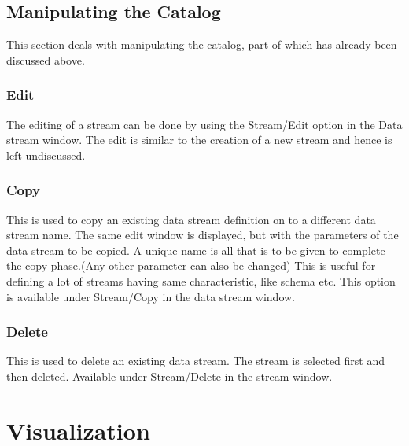 
\subsection{Manipulating the Catalog}

This section deals with manipulating the catalog, part of which has already been
discussed above.


\subsubsection{Edit}

The editing of a stream can be done by using the Stream/Edit option in the Data
stream window. The edit is similar to the creation of a new stream and hence is
left undiscussed.

\subsubsection{Copy}

This is used to copy an existing data stream definition on to a different data
stream name. The same edit window is displayed, but with the parameters of the
data stream to be copied. A unique name is all that is to be given to complete
the copy phase.(Any other parameter can also be changed) This is useful for
defining a lot of streams having same characteristic, like schema etc. This
option is available under Stream/Copy in the data stream window.

\subsubsection{Delete}

This is used to delete an existing data stream. The stream is selected first and
then deleted. Available under Stream/Delete in the stream window.


\section{Visualization}
\label{sect:visualization}


